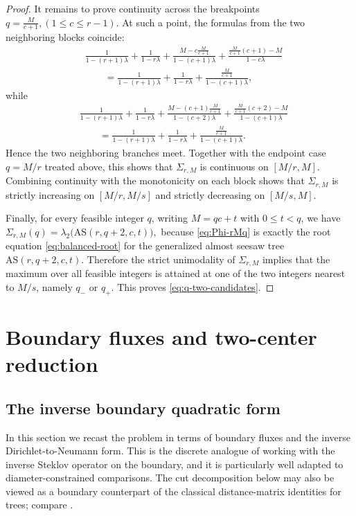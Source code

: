 \documentclass[11pt]{article}
\theoremstyle{remark}
\newcommand{\AS}{\mathrm{AS}}
\begin{document}
\begin{proof}
It remains to prove continuity across the breakpoints
$q=\frac{M}{c+1}, (1\le c\le r-1).$
At such a point, the formulas from the two neighboring blocks coincide:
$$
\begin{aligned}
&\frac{1}{1-(r+1)\lambda}
+\frac{1}{1-r\lambda}
+\frac{M-c\frac{M}{c+1}}{1-(c+1)\lambda}
+\frac{\frac{M}{c+1}(c+1)-M}{1-c\lambda}\\
&\qquad=
\frac{1}{1-(r+1)\lambda}
+\frac{1}{1-r\lambda}
+\frac{\frac{M}{c+1}}{1-(c+1)\lambda},
\end{aligned}
$$
while
$$
\begin{aligned}
&\frac{1}{1-(r+1)\lambda}
+\frac{1}{1-r\lambda}
+\frac{M-(c+1)\frac{M}{c+1}}{1-(c+2)\lambda}
+\frac{\frac{M}{c+1}(c+2)-M}{1-(c+1)\lambda}\\
&\qquad=
\frac{1}{1-(r+1)\lambda}
+\frac{1}{1-r\lambda}
+\frac{\frac{M}{c+1}}{1-(c+1)\lambda}.
\end{aligned}
$$
Hence the two neighboring branches meet. Together with the endpoint case $q=M/r$ treated above, this shows that $\Sigma_{r,M}$ is continuous on
$[M/r,M]$.
Combining continuity with the monotonicity on each block shows that $\Sigma_{r,M}$ is
strictly increasing on $[M/r,M/s]$ and strictly decreasing on $[M/s,M]$.

Finally, for every feasible integer $q$, writing $M=qc+t$ with $0\le t<q$, we have
$\Sigma_{r,M}(q)=\lambda_2\bigl(\AS(r,q+2,c,t)\bigr),$
because \eqref{eq:Phi-rMq} is exactly the root equation \eqref{eq:balanced-root} for the generalized almost seesaw tree $\AS(r,q+2,c,t)$.
Therefore the strict unimodality of $\Sigma_{r,M}$ implies that the maximum over all feasible
integers is attained at one of the two integers nearest to $M/s$, namely $q_-$ or $q_+$.
This proves \eqref{eq:q-two-candidates}.
\end{proof}

\section{Boundary fluxes and two-center reduction}\label{sec:reduction}

\subsection{The inverse boundary quadratic form}
In this section we recast the problem in terms of boundary fluxes and the inverse Dirichlet-to-Neumann form. This is the discrete analogue of working with the inverse Steklov operator on the boundary, and it is particularly well adapted to diameter-constrained comparisons. The cut decomposition below may also be viewed as a boundary counterpart of the classical distance-matrix identities for trees; compare \cite{GrahamPollak1971,GrahamLovasz1978,Merris1990}.
\end{document}
